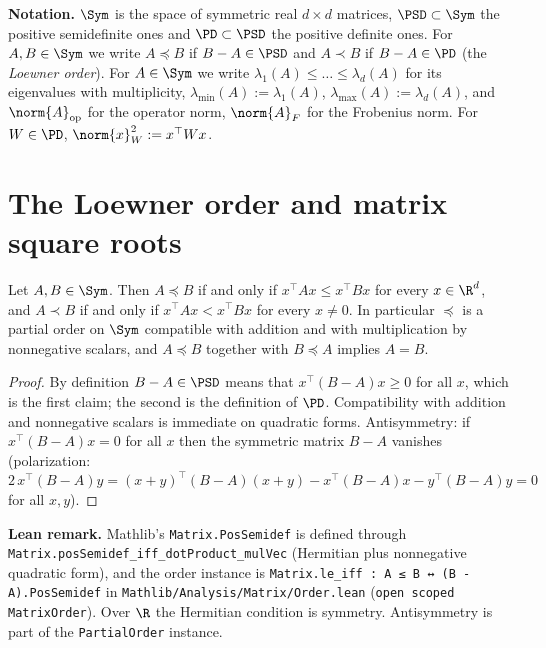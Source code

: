 \textbf{Notation.} $\Sym$ is the space of symmetric real $d \times d$ matrices, $\PSD \subset
\Sym$ the positive semidefinite ones and $\PD \subset \PSD$ the positive definite ones. For
$A, B \in \Sym$ we write $A \preceq B$ if $B - A \in \PSD$ and $A \prec B$ if $B - A \in \PD$
(the \emph{Loewner order}). For $A \in \Sym$ we write $\lambda_1(A) \le \dots \le \lambda_d(A)$
for its eigenvalues with multiplicity, $\lambda_{\min}(A) := \lambda_1(A)$,
$\lambda_{\max}(A) := \lambda_d(A)$, and $\norm{A}_{\mathrm{op}}$ for the operator norm,
$\norm{A}_F$ for the Frobenius norm. For $W \in \PD$, $\norm{x}_W^2 := x^\top W x$.

\section{The Loewner order and matrix square roots}
\label{sec:design_loewner}

\begin{lemma}\label{lem:loewner_quadratic}
\leanok
Let $A, B \in \Sym$. Then $A \preceq B$ if and only if $x^\top A x \le x^\top B x$ for every
$x \in \R^d$, and $A \prec B$ if and only if $x^\top A x < x^\top B x$ for every $x \ne 0$.
In particular $\preceq$ is a partial order on $\Sym$ compatible with addition and with
multiplication by nonnegative scalars, and $A \preceq B$ together with $B \preceq A$ implies
$A = B$.
\end{lemma}

\begin{proof}
\leanok
By definition $B - A \in \PSD$ means that $x^\top(B-A)x \ge 0$ for all $x$, which is the first
claim; the second is the definition of $\PD$. Compatibility with addition and nonnegative
scalars is immediate on quadratic forms. Antisymmetry: if $x^\top(B-A)x = 0$ for all $x$ then
the symmetric matrix $B - A$ vanishes (polarization: $2\,x^\top(B-A)y = (x+y)^\top(B-A)(x+y) -
x^\top(B-A)x - y^\top(B-A)y = 0$ for all $x, y$).
\end{proof}

\textbf{Lean remark.} Mathlib's \texttt{Matrix.PosSemidef} is defined through
\texttt{Matrix.posSemidef\_iff\_dotProduct\_mulVec} (Hermitian plus nonnegative quadratic form),
and the order instance is \texttt{Matrix.le\_iff : A ≤ B ↔ (B - A).PosSemidef} in
\texttt{Mathlib/Analysis/Matrix/Order.lean} (\texttt{open scoped MatrixOrder}). Over $\R$ the
Hermitian condition is symmetry. Antisymmetry is part of the \texttt{PartialOrder} instance.

